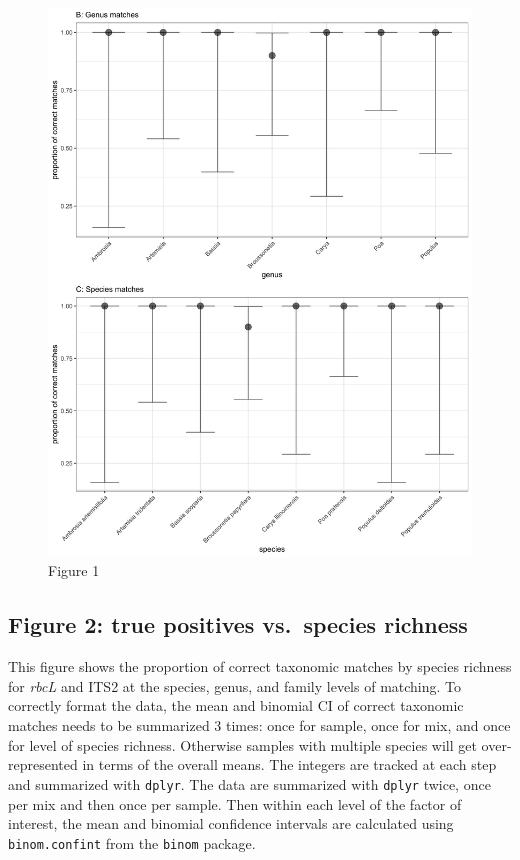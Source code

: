 \documentclass[
]{article}
\begin{document}
\begin{figure}
\centering
\includegraphics{fig1_combined.jpg}
\caption{Figure 1}
\end{figure}

\hypertarget{figure-2-true-positives-vs.-species-richness}{%
\subsection{Figure 2: true positives vs.~species
richness}\label{figure-2-true-positives-vs.-species-richness}}

This figure shows the proportion of correct taxonomic matches by species
richness for \emph{rbcL} and ITS2 at the species, genus, and family
levels of matching. To correctly format the data, the mean and binomial
CI of correct taxonomic matches needs to be summarized 3 times: once for
sample, once for mix, and once for level of species richness. Otherwise
samples with multiple species will get over-represented in terms of the
overall means. The integers are tracked at each step and summarized with
\texttt{dplyr}. The data are summarized with \texttt{dplyr} twice, once
per mix and then once per sample. Then within each level of the factor
of interest, the mean and binomial confidence intervals are calculated
using \texttt{binom.confint} from the \texttt{binom} package.
\end{document}

